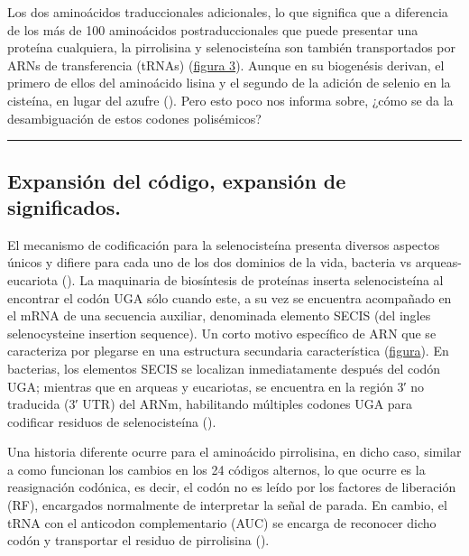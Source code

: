 \documentclass[
  12pt, krantz2,
  spanish,
]{krantz}
\begin{document}
Los dos aminoácidos traduccionales adicionales, lo que significa que a diferencia de los más de 100 aminoácidos postraduccionales que puede presentar una proteína cualquiera, la pirrolisina y selenocisteína son también transportados por ARNs de transferencia (tRNAs) (\protect\hyperlink{21Y22}{figura 3}). Aunque en su biogenésis derivan, el primero de ellos del aminoácido lisina y el segundo de la adición de selenio en la cisteína, en lugar del azufre (\citet{ling2015genetic}). Pero esto poco nos informa sobre, ¿cómo se da la desambiguación de estos codones polisémicos?

\begin{center}\rule{0.5\linewidth}{0.5pt}\end{center}

\hypertarget{expansiuxf3n-del-cuxf3digo-expansiuxf3n-de-significados.}{%
\subsection{Expansión del código, expansión de significados.}\label{expansiuxf3n-del-cuxf3digo-expansiuxf3n-de-significados.}}

El mecanismo de codificación para la selenocisteína presenta diversos aspectos únicos y difiere para cada uno de los dos dominios de la vida, bacteria vs arqueas-eucariota (\citet{ling2015genetic}). La maquinaria de biosíntesis de proteínas inserta selenocisteína al encontrar el codón UGA sólo cuando este, a su vez se encuentra acompañado en el mRNA de una secuencia auxiliar, denominada elemento SECIS (del ingles selenocysteine insertion sequence). Un corto motivo específico de ARN que se caracteriza por plegarse en una estructura secundaria característica (\protect\hyperlink{21y22}{figura}). En bacterias, los elementos SECIS se localizan inmediatamente después del codón UGA; mientras que en arqueas y eucariotas, se encuentra en la región 3′ no traducida (3′ UTR) del ARNm, habilitando múltiples codones UGA para codificar residuos de selenocisteína (\citet{vera2008codigo}).

Una historia diferente ocurre para el aminoácido pirrolisina, en dicho caso, similar a como funcionan los cambios en los 24 códigos alternos, lo que ocurre es la reasignación codónica, es decir, el codón no es leído por los factores de liberación (RF), encargados normalmente de interpretar la señal de parada. En cambio, el tRNA con el anticodon complementario (AUC) se encarga de reconocer dicho codón y transportar el residuo de pirrolisina (\citet{ling2015genetic}).
\end{document}
